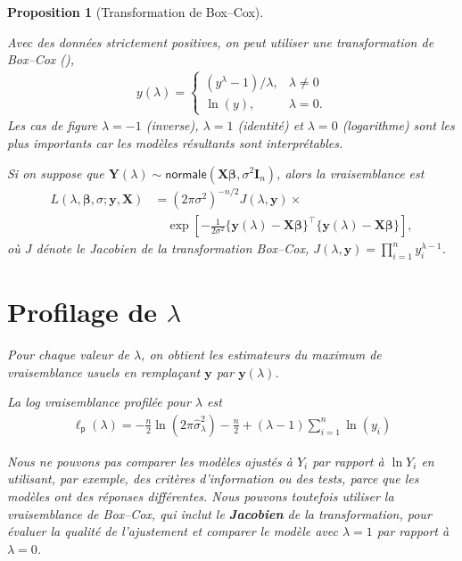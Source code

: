 \documentclass[
  11pt,
  letterpaper,
]{scrbook}
\theoremstyle{plain}
\newtheorem{proposition}{Proposition}[chapter]
\theoremstyle{plain}
\theoremstyle{definition}
\theoremstyle{definition}
\theoremstyle{remark}
\begin{document}
\begin{proposition}[Transformation de
Box--Cox]\protect\hypertarget{prp-boxcox}{}\label{prp-boxcox}

Avec des données strictement positives, on peut utiliser une
transformation de Box--Cox (), \begin{align*}
y(\lambda)= \begin{cases}
(y^{\lambda}-1)/\lambda, & \lambda \neq 0\\
\ln(y), & \lambda=0.
\end{cases}
\end{align*} Les cas de figure \(\lambda=-1\) (inverse), \(\lambda=1\)
(identité) et \(\lambda=0\) (logarithme) sont les plus importants car
les modèles résultants sont interprétables.

Si on suppose que
\(\boldsymbol{Y}(\lambda) \sim \mathsf{normale}(\mathbf{X}\boldsymbol{\beta}, \sigma^2 \mathbf{I}_n)\),
alors la vraisemblance est \begin{align*}
L(\lambda, \boldsymbol{\beta}, \sigma; \boldsymbol{y}, \mathbf{X}) &= (2\pi\sigma^2)^{-n/2} J(\lambda, \boldsymbol{y}) \times\\& \quad \exp \left[ - \frac{1}{2\sigma^2}\{\boldsymbol{y}(\lambda) - \mathbf{X}\boldsymbol{\beta}\}^\top\{\boldsymbol{y}(\lambda) - \mathbf{X}\boldsymbol{\beta}\}\right],
\end{align*} où \(J\) dénote le Jacobien de la transformation Box--Cox,
\(J(\lambda, \boldsymbol{y})=\prod_{i=1}^n y_i^{\lambda-1}\).

\section{\texorpdfstring{Profilage de
\(\lambda\)}{Profilage de \textbackslash lambda}}\label{profilage-de-lambda}

Pour chaque valeur de \(\lambda\), on obtient les estimateurs du maximum
de vraisemblance usuels en remplaçant \(\boldsymbol{y}\) par
\(\boldsymbol{y}(\lambda)\).

La log vraisemblance profilée pour \(\lambda\) est \begin{align*}
\ell_{\mathsf{p}}(\lambda) = -\frac{n}{2}\ln(2\pi \widehat{\sigma}^2_\lambda) - \frac{n}{2} + (\lambda - 1)\sum_{i=1}^n \ln(y_i)
\end{align*}

Nous ne pouvons pas comparer les modèles ajustés à \(Y_i\) par rapport à
\(\ln Y_i\) en utilisant, par exemple, des critères d'information ou des
tests, parce que les modèles ont des réponses différentes. Nous pouvons
toutefois utiliser la vraisemblance de Box--Cox, qui inclut le
\textbf{Jacobien} de la transformation, pour évaluer la qualité de
l'ajustement et comparer le modèle avec \(\lambda=1\) par rapport à
\(\lambda=0\).


\end{proposition}
\end{document}
